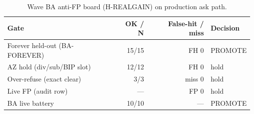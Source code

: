 \begin{table}[t]
\centering
\caption{Wave BA anti-FP board (H-REALGAIN) on production ask path.}
\label{tab:antifp}
\begin{tabular}{lrrl}
\toprule
Gate & OK / N & False-hit / miss & Decision \\
\midrule
Forever held-out (BA-FOREVER) & 15/15 & FH $0$ & PROMOTE \\
AZ hold (div/sub/BIP slot) & 12/12 & FH $0$ & hold \\
Over-refuse (exact clear) & 3/3 & miss $0$ & hold \\
Live FP (audit row) & --- & FP $0$ & hold \\
BA live battery & 10/10 & --- & PROMOTE \\
\bottomrule
\end{tabular}
\end{table}
